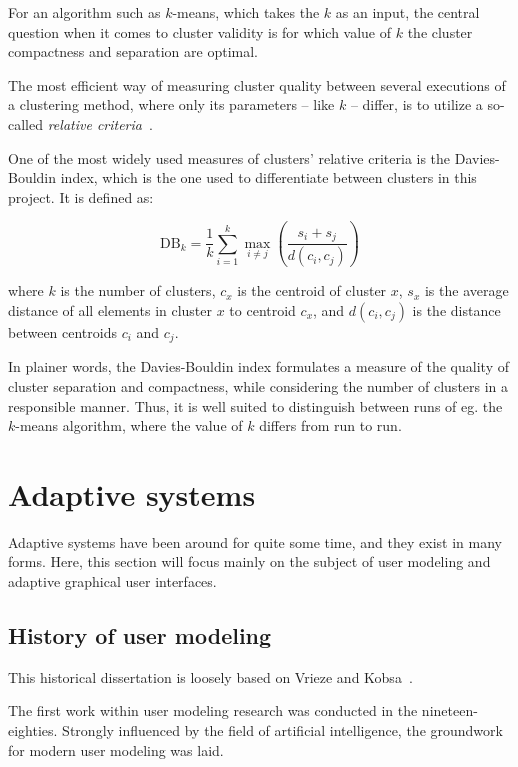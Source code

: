     For an algorithm such as $k$-means, which takes the $k$ as an input, the central question when it comes to cluster validity is for which value of $k$ the cluster compactness and separation are optimal.

    The most efficient way of measuring cluster quality between several executions of a clustering method, where only its parameters -- like $k$ -- differ, is to utilize a so-called \emph{relative criteria}~\cite{Halkidi2001}.

    One of the most widely used measures of clusters' relative criteria is the Davies-Bouldin index, which is the one used to differentiate between clusters in this project. It is defined as:

    \begin{equation}
      \text{DB}_k = \frac{1}{k} \sum_{i=1}^k \max_{i \neq j} \left( \frac{s_i + s_j}{d(c_i, c_j)} \right)
    \end{equation}

    where $k$ is the number of clusters, $c_x$ is the centroid of cluster $x$, $s_x$ is the average distance of all elements in cluster $x$ to centroid $c_x$, and $d(c_i,c_j)$ is the distance between centroids $c_i$ and $c_j$.

    In plainer words, the Davies-Bouldin index formulates a measure of the quality of cluster separation and compactness, while considering the number of clusters in a responsible manner. Thus, it is well suited to distinguish between runs of eg. the $k$-means algorithm, where the value of $k$ differs from run to run.

\section{Adaptive systems}
\label{survey:adaptive_systems}

  Adaptive systems have been around for quite some time, and they exist in many forms. Here, this section will focus mainly on the subject of user modeling and adaptive graphical user interfaces.

  \subsection{History of user modeling}

    This historical dissertation is loosely based on Vrieze and Kobsa~\cite{Vrieze,Kobsa2001}.

    The first work within user modeling research was conducted in the nineteen-eighties. Strongly influenced by the field of artificial intelligence, the groundwork for modern user modeling was laid.

